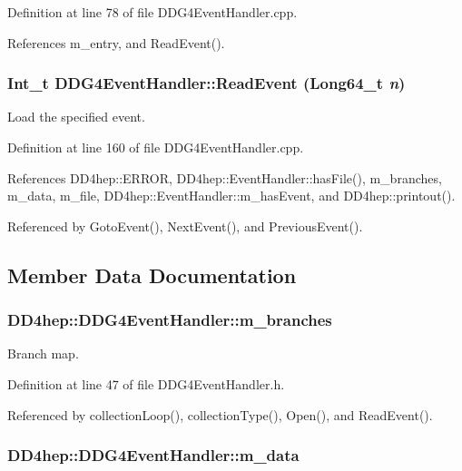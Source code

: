 Definition at line 78 of file DDG4EventHandler.cpp.

References m\_\-entry, and ReadEvent().\hypertarget{class_d_d4hep_1_1_d_d_g4_event_handler_ad89bd74bf6a00c80055a0332a66ddee5}{
\subsubsection[{ReadEvent}]{\setlength{\rightskip}{0pt plus 5cm}Int\_\-t DDG4EventHandler::ReadEvent (Long64\_\-t {\em n})}}
\label{class_d_d4hep_1_1_d_d_g4_event_handler_ad89bd74bf6a00c80055a0332a66ddee5}


Load the specified event. 

Definition at line 160 of file DDG4EventHandler.cpp.

References DD4hep::ERROR, DD4hep::EventHandler::hasFile(), m\_\-branches, m\_\-data, m\_\-file, DD4hep::EventHandler::m\_\-hasEvent, and DD4hep::printout().

Referenced by GotoEvent(), NextEvent(), and PreviousEvent().

\subsection{Member Data Documentation}
\hypertarget{class_d_d4hep_1_1_d_d_g4_event_handler_a33ae5f13b50b604cf914ba4d86aa3c35}{
\subsubsection[{m\_\-branches}]{ {\bf DD4hep::DDG4EventHandler::m\_\-branches}}}
\label{class_d_d4hep_1_1_d_d_g4_event_handler_a33ae5f13b50b604cf914ba4d86aa3c35}


Branch map. 

Definition at line 47 of file DDG4EventHandler.h.

Referenced by collectionLoop(), collectionType(), Open(), and ReadEvent().\hypertarget{class_d_d4hep_1_1_d_d_g4_event_handler_a11dcb61378ef3044f34723cc25aec8b7}{
\subsubsection[{m\_\-data}]{ {\bf DD4hep::DDG4EventHandler::m\_\-data}}}
\label{class_d_d4hep_1_1_d_d_g4_event_handler_a11dcb61378ef3044f34723cc25aec8b7}


